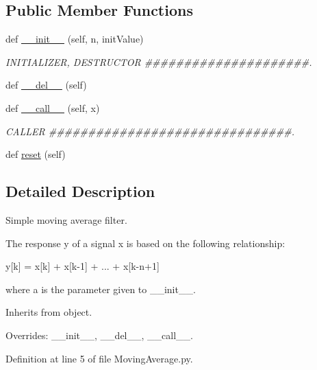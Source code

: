 \subsection*{Public Member Functions}
\begin{DoxyCompactItemize}
\item 
def \mbox{\hyperlink{classwindshape_1_1drone_1_1common_1_1_moving_average_1_1_moving_average_ac088c972b5486cb25ffe3e9de05e3877}{\+\_\+\+\_\+init\+\_\+\+\_\+}} (self, n, init\+Value)
\begin{DoxyCompactList}\small\item\em I\+N\+I\+T\+I\+A\+L\+I\+Z\+ER, D\+E\+S\+T\+R\+U\+C\+T\+OR \#\#\#\#\#\#\#\#\#\#\#\#\#\#\#\#\#\#\#\#\#. \end{DoxyCompactList}\item 
def \mbox{\hyperlink{classwindshape_1_1drone_1_1common_1_1_moving_average_1_1_moving_average_a74d7a24f0c993bc6ac175ec5280b1411}{\+\_\+\+\_\+del\+\_\+\+\_\+}} (self)
\item 
def \mbox{\hyperlink{classwindshape_1_1drone_1_1common_1_1_moving_average_1_1_moving_average_adc79175d843a7cb13f870a75cdb65648}{\+\_\+\+\_\+call\+\_\+\+\_\+}} (self, x)
\begin{DoxyCompactList}\small\item\em C\+A\+L\+L\+ER \#\#\#\#\#\#\#\#\#\#\#\#\#\#\#\#\#\#\#\#\#\#\#\#\#\#\#\#\#\#\#. \end{DoxyCompactList}\item 
def \mbox{\hyperlink{classwindshape_1_1drone_1_1common_1_1_moving_average_1_1_moving_average_a3ab8f769d43e4da70a42f0f7244c0413}{reset}} (self)
\end{DoxyCompactItemize}


\subsection{Detailed Description}
\begin{DoxyVerb}Simple moving average filter.

The response y of a signal x is based on the following relationship:

y[k] = x[k] + x[k-1] + ... + x[k-n+1]

where a is the parameter given to __init__. 

Inherits from object.

Overrides: __init__, __del__, __call__.
\end{DoxyVerb}
 

Definition at line 5 of file Moving\+Average.\+py.



